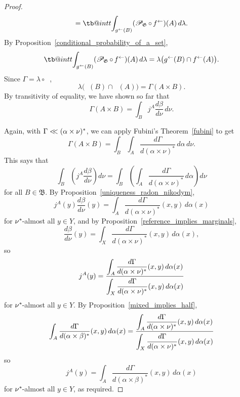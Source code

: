 \documentclass[
twoside=true,
paper=letter,
fontsize=9pt,
pagesize=auto,
leqno,
openany,
headsepline,
overfullrule,
]{scrbook}
\makeatletter
\theoremstyle{plain}
\theoremstyle{plain}
\theoremstyle{definition}
\theoremstyle{bfnoteitalic}
\theoremstyle{bfnoteroman}
\newcommand{\sigalg}[1]{\mathfrak{#1}}
\newcommand{\cali}[1]{\mathscr{#1}}
\newcommand{\condprobop}[1]{\mathop{\cali{P}\hspace{-1pt}}\nolimits_{#1}}
\newcommand{\preimage}[1]{\mathop{#1^{\leftarrow}}}
\newcommand{\meets}{\cap}
\newcommand{\sigmaalgebraii}{\sigalg{B}}
\newcommand{\kernast}{\ast\kern-1pt}
\newcommand{\lilstrut}{\vphantom{\bigl(}}
\newcommand{\funcf}{f}
\newcommand{\funcg}{g}
\newcommand{\funcj}{j}
\newcommand{\measurespace}{X}
\newcommand{\measurespaceii}{Y}
\newcommand{\mspaceelt}{x}
\newcommand{\mspaceeltii}{y}
\newcommand{\abscont}{\mathrel{< \kern-3.5pt <}}
\newcommand{\measnu}{\nu}
\newcommand{\measlambda}{\lambda}
\newcommand{\seti}{A}
\newcommand{\setii}{B}
\newcommand{\measonprod}{\Gamma}%
\newcommand{\marginalone}{\alpha}%
\newcommand{\marginaltwo}{\beta}%
\newcommand\tint{\mathop{\mathpalette\tb@int{t}}\!\int}
\newcommand\tb@int[2]{%
  \sbox\z@{$\m@th#1\int$}%
  \if#2t%
    \rlap{\hbox to\wd\z@{%
      \hfil
      \vrule width .35em height \dimexpr\ht\z@+1.4pt\relax depth -\dimexpr\ht\z@+1pt\relax
      \kern.05em %
    }}
  \else
    \rlap{\hbox to\wd\z@{%
      \vrule width .35em height -\dimexpr\dp\z@+1pt\relax depth \dimexpr\dp\z@+1.4pt\relax
      \hfil
    }}
  \fi
}
\newcommand{\inducedint}{\tint}
\makeatother
\begin{document}
\begin{proof}
\[=
\inducedint_{\preimage{\funcg}(\setii)}
(\condprobop{\sigalg{G}}\circ \preimage{\funcf})(\seti)\,d\measlambda.
\]
By Proposition~\ref{conditional_probability_of_a_set},
\[
\inducedint_{\preimage{\funcg}(\setii)}
(\condprobop{\sigalg{G}}\circ \preimage{\funcf})(\seti)\,d\measlambda
=
\measlambda\bigl(\preimage{\funcg}(\setii)\meets\preimage{\funcf}(\seti)\bigr).
\]
Since
$\measonprod =
\measlambda\circ\preimage{({\funcf,\funcg})}$,
\[
\measlambda\bigl(\preimage{\funcg}(\setii)\meets\preimage{\funcf}(\seti)\bigr)
=
\measonprod(\seti\times\setii).
\]
By transitivity of equality, we have shown so far that
\[
\measonprod(\seti\times\setii)
=
\int_\setii \funcj^\seti  \dfrac{d\marginaltwo}{d\measnu} \, d \measnu.
\]

Again, with
$\measonprod\abscont(\marginalone\times\measnu)^*$,
we can apply Fubini's Theorem~\ref{fubini} to get
\[
\measonprod(\seti\times\setii)
=
\int_\setii
\int_\seti
\dfrac{d\measonprod}{d(\marginalone\times\measnu)^*}
\, d\marginalone
\, d\measnu.
\]
This says that
\[
\int_\setii
\left( \funcj^\seti  \dfrac{d\marginaltwo}{d\measnu} \right)
d \measnu
=
\int_\setii
\left(
\int_\seti
\dfrac{d\measonprod}{d(\marginalone\times\measnu)^*}
\, d\marginalone
\right)
d\measnu
\]
for all $\setii\in\sigmaalgebraii$.
By Proposition~\ref{uniqueness_radon_nikodym},
\[
\funcj^\seti(\mspaceeltii)  \dfrac{d\marginaltwo}{d\measnu}(\mspaceeltii)
=
\int_\seti
\dfrac{d\measonprod}{d(\marginalone\times\measnu)^*}(\mspaceelt,\mspaceeltii)
\, d\marginalone(\mspaceelt)
\]
for $\measnu^\kernast$\hyp{}almost all $\mspaceeltii\in\measurespaceii$,
and by Proposition~\ref{reference_implies_marginals},
\[
\frac{d \marginaltwo}
{d\measnu}(\mspaceeltii)
=
\int_{\measurespace}
\frac{d\measonprod}{d(\marginalone\times\measnu)^*}
(\mspaceelt,\mspaceeltii)\,d\marginalone(\mspaceelt),
\]
so
\[
\funcj^\seti(\mspaceeltii)
=
\dfrac{\displaystyle \int_\seti
\dfrac{d\measonprod}{d(\marginalone\times\measnu)^*}(\mspaceelt,\mspaceeltii)
\, d\marginalone(\mspaceelt)}
{\displaystyle\int_{\measurespace}
\frac{d\measonprod\lilstrut}{d(\marginalone\times\measnu)^*}
(\mspaceelt,\mspaceeltii)\,d\marginalone(\mspaceelt)}
\]
for $\measnu^\kernast$\hyp{}almost all $\mspaceeltii\in\measurespaceii$.
By Proposition~\ref{mixed_implies_half},
\[
\int_\seti
\frac{d\measonprod}{d(\marginalone\times\marginaltwo)^*}
(\mspaceelt,\mspaceeltii)\,d\marginalone(\mspaceelt)
=
\frac{\displaystyle
\int_\seti
\dfrac{d\measonprod}{d(\marginalone\times\measnu)^*}(\mspaceelt,\mspaceeltii)
\,d\marginalone(\mspaceelt)
}
{\displaystyle
\int_\measurespace
\dfrac{d\measonprod\lilstrut}{d(\marginalone\times\measnu)^*}(\mspaceelt,\mspaceeltii)
\,d\marginalone(\mspaceelt)
}
\]
so
\[
\funcj^\seti(\mspaceeltii)
=
\int_\seti
\frac{d\measonprod}{d(\marginalone\times\marginaltwo)^*}
(\mspaceelt,\mspaceeltii)\,d\marginalone(\mspaceelt)
\]
for $\measnu^\kernast$\hyp{}almost all $\mspaceeltii\in\measurespaceii$,
as required.
\end{proof}
\end{document}
